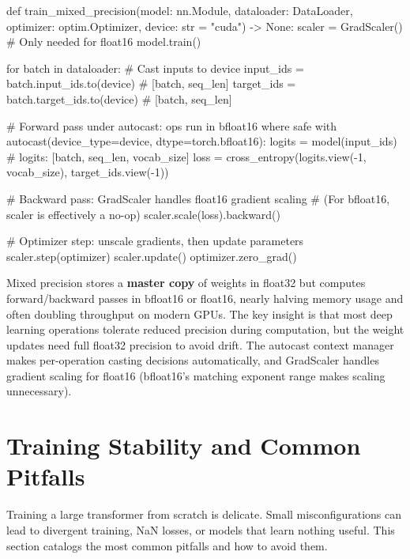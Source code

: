 \begin{pseudocode}
def train_mixed_precision(model: nn.Module, dataloader: DataLoader,
                          optimizer: optim.Optimizer,
                          device: str = "cuda") -> None:
    scaler = GradScaler()              # Only needed for float16
    model.train()

    for batch in dataloader:
        # Cast inputs to device
        input_ids = batch.input_ids.to(device)    # [batch, seq_len]
        target_ids = batch.target_ids.to(device)  # [batch, seq_len]

        # Forward pass under autocast: ops run in bfloat16 where safe
        with autocast(device_type=device, dtype=torch.bfloat16):
            logits = model(input_ids)
            # logits: [batch, seq_len, vocab_size]
            loss = cross_entropy(logits.view(-1, vocab_size),
                                 target_ids.view(-1))

        # Backward pass: GradScaler handles float16 gradient scaling
        # (For bfloat16, scaler is effectively a no-op)
        scaler.scale(loss).backward()

        # Optimizer step: unscale gradients, then update parameters
        scaler.step(optimizer)
        scaler.update()
        optimizer.zero_grad()
\end{pseudocode}

\begin{keyconcept}
  Mixed precision stores a \textbf{master copy} of weights in float32 but computes forward/backward passes in bfloat16 or float16, nearly halving memory usage and often doubling throughput on modern GPUs. The key insight is that most deep learning operations tolerate reduced precision during computation, but the weight updates need full float32 precision to avoid drift. The autocast context manager makes per-operation casting decisions automatically, and GradScaler handles gradient scaling for float16 (bfloat16's matching exponent range makes scaling unnecessary).
\end{keyconcept}

\section{Training Stability and Common Pitfalls}

Training a large transformer from scratch is delicate. Small misconfigurations can lead to divergent training, NaN losses, or models that learn nothing useful. This section catalogs the most common pitfalls and how to avoid them.

